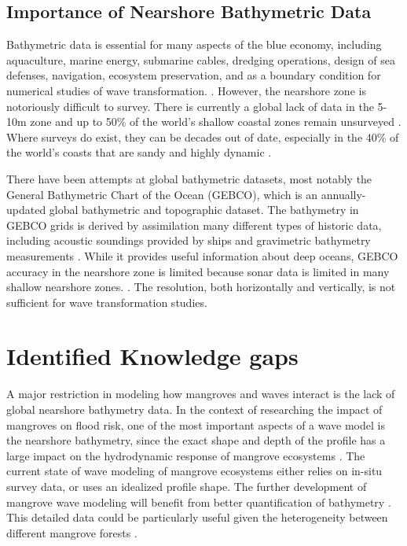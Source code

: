 \subsection{Importance of Nearshore Bathymetric Data}

 Bathymetric data is essential for many aspects of the blue economy, including aquaculture, marine energy, submarine cables, dredging operations, design of sea defenses, navigation, ecosystem preservation, and as a boundary condition for numerical studies of wave transformation. \parencite{Cesbron2021,Ashphaq2021}. However, the nearshore zone is notoriously difficult to survey. There is currently a global lack of data in the 5-10m zone \parencite{Albright2021} and up to 50\% of the world's shallow coastal zones remain unsurveyed \parencite{IHO/OHI2022}. Where surveys do exist, they can be decades out of date, especially in the 40\% of the world's coasts that are sandy and highly dynamic \parencite{Almar2021e}.

There have been attempts at global bathymetric datasets, most notably the General Bathymetric Chart of the Ocean (GEBCO), which is an annually-updated global bathymetric and topographic dataset. The bathymetry in GEBCO grids is derived by assimilation many different types of historic data, including  acoustic soundings provided by ships and gravimetric bathymetry measurements \parencite{Cesbron2021}. While it provides useful information about deep oceans, GEBCO accuracy in the nearshore zone is limited because sonar data is limited in many shallow nearshore zones. \parencite{Monteys2015}. The resolution, both horizontally and vertically, is not sufficient for wave transformation studies.

\section{Identified Knowledge gaps}

A major restriction in modeling how mangroves and waves interact is the lack of global nearshore bathymetry data. In the context of researching the impact of mangroves on flood risk, one of the most important aspects of a wave model is the nearshore bathymetry, since the exact shape and depth of the profile has a large impact on the hydrodynamic response of mangrove ecosystems \parencite{Horstman2014,Maza2019}. The current state of wave modeling of mangrove ecosystems either relies on in-situ survey data, or uses an idealized profile shape. The further development of mangrove wave modeling will benefit from better quantification of bathymetry \parencite{Menendez2020,GijonMancheno2021}. This detailed data could be particularly useful given the heterogeneity between different mangrove forests \parencite{Mazda2013}.

